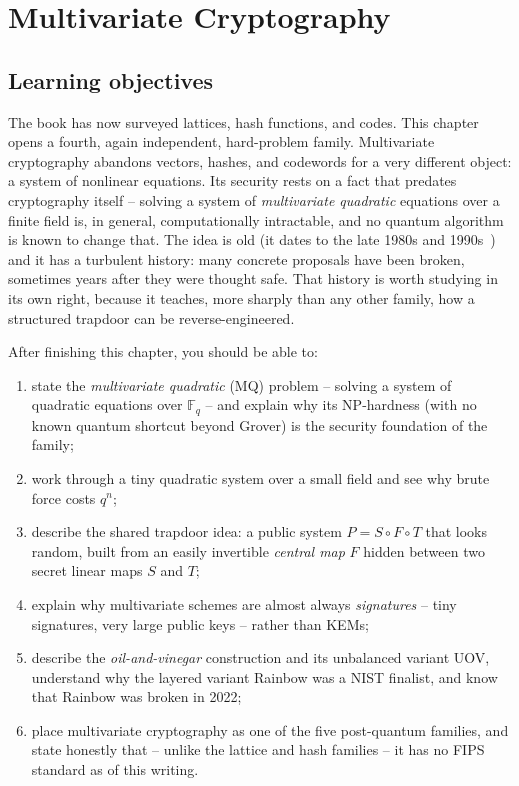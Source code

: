 \chapter{Multivariate Cryptography}
\label{ch:multivariate}

\section{Learning objectives}

The book has now surveyed lattices, hash functions, and codes. This chapter opens a fourth, again independent, hard-problem family. Multivariate cryptography abandons vectors, hashes, and codewords for a very different object: a system of nonlinear equations. Its security rests on a fact that predates cryptography itself -- solving a system of \emph{multivariate quadratic} equations over a finite field is, in general, computationally intractable, and no quantum algorithm is known to change that. The idea is old (it dates to the late 1980s and 1990s~\cite{ding2006}) and it has a turbulent history: many concrete proposals have been broken, sometimes years after they were thought safe. That history is worth studying in its own right, because it teaches, more sharply than any other family, how a structured trapdoor can be reverse-engineered.

After finishing this chapter, you should be able to:

\begin{enumerate}
  \item state the \emph{multivariate quadratic} (MQ) problem -- solving a system of quadratic equations over $\mathbb{F}_q$ -- and explain why its NP-hardness (with no known quantum shortcut beyond Grover) is the security foundation of the family;
  \item work through a tiny quadratic system over a small field and see why brute force costs $q^n$;
  \item describe the shared trapdoor idea: a public system $P = S \circ F \circ T$ that looks random, built from an easily invertible \emph{central map} $F$ hidden between two secret linear maps $S$ and $T$;
  \item explain why multivariate schemes are almost always \emph{signatures} -- tiny signatures, very large public keys -- rather than KEMs;
  \item describe the \emph{oil-and-vinegar} construction and its unbalanced variant UOV, understand why the layered variant Rainbow was a NIST finalist, and know that Rainbow was broken in 2022;
  \item place multivariate cryptography as one of the five post-quantum families, and state honestly that -- unlike the lattice and hash families -- it has no FIPS standard as of this writing.
\end{enumerate}

